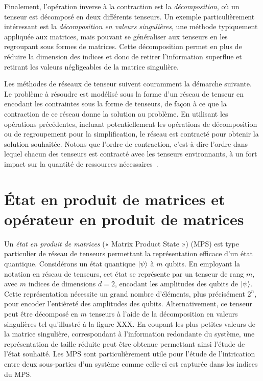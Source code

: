 Finalement, l'opération inverse à la contraction est la \textit{décomposition}, où un tenseur est décomposé en deux différents tenseurs. Un exemple particulièrement intéressant est la \textit{décomposition en valeurs singulières}, une méthode typiquement appliquée aux matrices, mais pouvant se généraliser aux tenseurs en les regroupant sous formes de matrices. Cette décomposition permet en plus de réduire la dimension des indices et donc de retirer l'information superflue et retirant les valeurs négligeables de la matrice singulière.

Les méthodes de réseaux de tenseur suivent couramment la démarche suivante. Le problème à résoudre est modélisé sous la forme d'un réseau de tenseur en encodant les contraintes sous la forme de tenseurs, de façon à ce que la contraction de ce réseau donne la solution au problème. En utilisant les opérations précédentes, incluant potentiellement les opérations de décomposition ou de regroupement pour la simplification, le réseau est contracté pour obtenir la solution souhaitée. Notons que l'ordre de contraction, c'est-à-dire l'ordre dans lequel chacun des tenseurs est contracté avec les tenseurs environnants, à un fort impact sur la quantité de ressources nécessaires~\cite{grayHyperoptimizedTensorNetwork2021}.


\section{État en produit de matrices et opérateur en produit de matrices}
\label{sec:mps-mpo}

Un \textit{état en produit de matrices} (« Matrix Product State ») (MPS) est type particulier de réseau de tenseurs permettant la représentation efficace d'un état quantique. Considérons un état quantique $\ket{\psi}$ à $m$ qubits. En employant la notation en réseau de tenseurs, cet état se représente par un tenseur de rang $m$, avec $m$ indices de dimensions $d=2$, encodant les amplitudes des qubits de $\ket{\psi}$. Cette représentation nécessite un grand nombre d'éléments, plus précisément $2^{n}$, pour encoder l'entièreté des amplitudes des qubits. Alternativement, ce tenseur peut être décomposé en $m$ tenseurs à l'aide de la décomposition en valeurs singulières tel qu'illustré à la figure XXX. En coupant les plus petites valeurs de la matrice singulière, correspondant à l'information redondante du système, une représentation de taille réduite peut être obtenue permettant ainsi l'étude de l'état souhaité. Les MPS sont particulièrement utile pour l'étude de l'intrication entre deux sous-parties d'un système comme celle-ci est capturée dans les indices du MPS.

